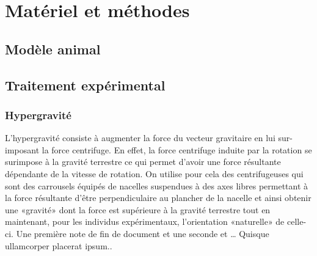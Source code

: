 \section{Matériel et méthodes}
\subsection{Modèle animal}
\lipsum[1]
\subsection{Traitement expérimental}
\subsubsection{Hypergravité}
\label{hypergravite} %
L'hypergravité consiste à augmenter la force du vecteur gravitaire en lui sur-imposant la force centrifuge. En effet, la force centrifuge induite par la rotation se surimpose à la gravité terrestre ce qui permet d'avoir une force résultante dépendante de la vitesse de rotation. On utilise pour cela des centrifugeuses qui sont des carrousels équipés de nacelles suspendues à des axes libres permettant à la force résultante d'être perpendiculaire au plancher de la nacelle et ainsi obtenir une «gravité» dont la force est supérieure à la gravité terrestre tout en maintenant, pour les individus expérimentaux, l'orientation «naturelle» de celle-ci. %
Une première note de fin de document et une seconde et \ldots {}        Quisque ullamcorper placerat ipsum.\endnote{\lipsum[1]}.
